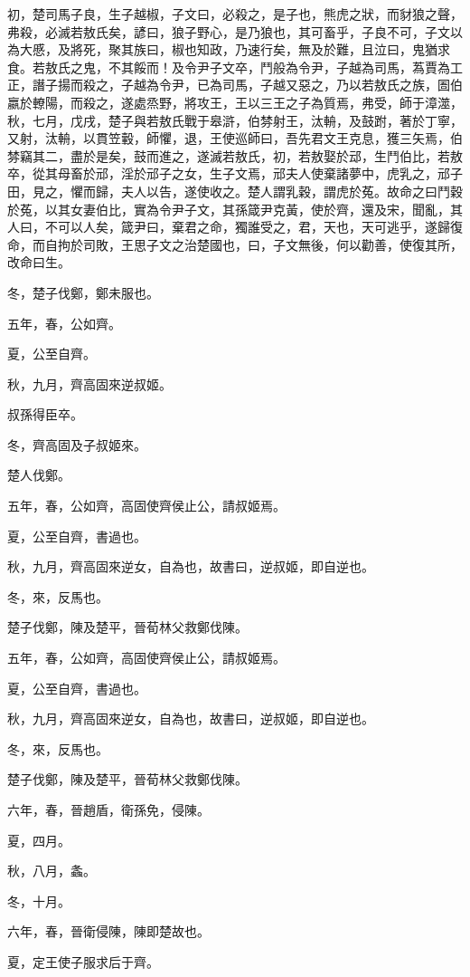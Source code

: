 \begin{pinyinscope}
初，楚司馬子良，生子越椒，子文曰，必殺之，是子也，熊虎之狀，而豺狼之聲，弗殺，必滅若敖氏矣，諺曰，狼子野心，是乃狼也，其可畜乎，子良不可，子文以為大慼，及將死，聚其族曰，椒也知政，乃速行矣，無及於難，且泣曰，鬼猶求食。若敖氏之鬼，不其餒而！及令尹子文卒，鬥般為令尹，子越為司馬，蒍賈為工正，譖子揚而殺之，子越為令尹，已為司馬，子越又惡之，乃以若敖氏之族，圄伯嬴於轑陽，而殺之，遂處烝野，將攻王，王以三王之子為質焉，弗受，師于漳澨，秋，七月，戊戌，楚子與若敖氏戰于皋滸，伯棼射王，汰輈，及鼓跗，著於丁寧，又射，汰輈，以貫笠轂，師懼，退，王使巡師曰，吾先君文王克息，獲三矢焉，伯棼竊其二，盡於是矣，鼓而進之，遂滅若敖氏，初，若敖娶於䢵，生鬥伯比，若敖卒，從其母畜於邧，淫於邧子之女，生子文焉，邧夫人使棄諸夢中，虎乳之，邧子田，見之，懼而歸，夫人以告，遂使收之。楚人謂乳穀，謂虎於菟。故命之曰鬥穀於菟，以其女妻伯比，實為令尹子文，其孫箴尹克黃，使於齊，還及宋，聞亂，其人曰，不可以人矣，箴尹曰，棄君之命，獨誰受之，君，天也，天可逃乎，遂歸復命，而自拘於司敗，王思子文之治楚國也，曰，子文無後，何以勸善，使復其所，改命曰生。

冬，楚子伐鄭，鄭未服也。

五年，春，公如齊。

夏，公至自齊。

秋，九月，齊高固來逆叔姬。

叔孫得臣卒。

冬，齊高固及子叔姬來。

楚人伐鄭。

五年，春，公如齊，高固使齊侯止公，請叔姬焉。

夏，公至自齊，書過也。

秋，九月，齊高固來逆女，自為也，故書曰，逆叔姬，即自逆也。

冬，來，反馬也。

楚子伐鄭，陳及楚平，晉荀林父救鄭伐陳。

五年，春，公如齊，高固使齊侯止公，請叔姬焉。

夏，公至自齊，書過也。

秋，九月，齊高固來逆女，自為也，故書曰，逆叔姬，即自逆也。

冬，來，反馬也。

楚子伐鄭，陳及楚平，晉荀林父救鄭伐陳。

六年，春，晉趙盾，衛孫免，侵陳。

夏，四月。

秋，八月，螽。

冬，十月。

六年，春，晉衛侵陳，陳即楚故也。

夏，定王使子服求后于齊。


\end{pinyinscope}
